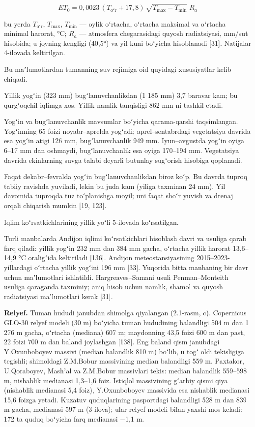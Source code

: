 \begin{equation}\tag{2.1}
ET_0 = 0{,}0023 \, (T_{\mathrm{oʻr}} + 17{,}8) \, \sqrt{T_{\mathrm{max}} - T_{\mathrm{min}}} \; R_a
\end{equation}

bu yerda \(T_{\mathrm{oʻr}}\), \(T_{\mathrm{max}}\),
\(T_{\mathrm{min}}\) --- oylik oʻrtacha, oʻrtacha maksimal va oʻrtacha
minimal harorat, °C; \(R_{a}\) --- atmosfera chegarasidagi quyosh
radiatsiyasi, mm/sut hisobida; u joyning kengligi (40,5°) va yil kuni
boʻyicha hisoblanadi {[}31{]}. Natijalar 4-ilovada keltirilgan.

Bu maʼlumotlardan tumanning suv rejimiga oid quyidagi xususiyatlar kelib
chiqadi.

Yillik yogʻin (323 mm) bugʻlanuvchanlikdan (1 185 mm) 3,7 baravar kam;
bu qurgʻoqchil iqlimga xos. Yillik namlik tanqisligi 862 mm ni tashkil
etadi.

Yogʻin va bugʻlanuvchanlik mavsumlar boʻyicha qarama-qarshi
taqsimlangan. Yogʻinning 65 foizi noyabr--aprelda yogʻadi;
aprel--sentabrdagi vegetatsiya davrida esa yogʻin atigi 126 mm,
bugʻlanuvchanlik 949 mm. Iyun--avgustda yogʻin oyiga 6--17 mm dan
oshmaydi, bugʻlanuvchanlik esa oyiga 170--194 mm. Vegetatsiya davrida
ekinlarning suvga talabi deyarli butunlay sugʻorish hisobiga qoplanadi.

Faqat dekabr--fevralda yogʻin bugʻlanuvchanlikdan biroz koʻp. Bu davrda
tuproq tabiiy ravishda yuviladi, lekin bu juda kam (yiliga taxminan 24
mm). Yil davomida tuproqda tuz toʻplanishga moyil; uni faqat shoʻr
yuvish va drenaj orqali chiqarish mumkin {[}19, 123{]}.

Iqlim koʻrsatkichlarining yillik yoʻli 5-ilovada koʻrsatilgan.

Turli manbalarda Andijon iqlimi koʻrsatkichlari hisoblash davri va
usuliga qarab farq qiladi: yillik yogʻin 232 mm dan 384 mm gacha,
oʻrtacha yillik harorat 13,6--14,9 °C oraligʻida keltiriladi {[}136{]}.
Andijon meteostansiyasining 2015--2023-yillardagi oʻrtacha yillik
yogʻini 196 mm {[}33{]}. Yuqorida bitta manbaning bir davr uchun
maʼlumotlari ishlatildi. Hargreaves--Samani usuli Penman--Monteith
usuliga qaraganda taxminiy; aniq hisob uchun namlik, shamol va quyosh
radiatsiyasi maʼlumotlari kerak {[}31{]}.

\textbf{Relyef.} Tuman hududi janubdan shimolga qiyalangan (2.1-rasm,
c). Copernicus GLO-30 relyef modeli (30 m) boʻyicha tuman hududining
balandligi 504 m dan 1 276 m gacha, oʻrtacha (mediana) 607 m; maydonning
43,5 foizi 600 m dan past, 22 foizi 700 m dan baland joylashgan
{[}138{]}. Eng baland qism janubdagi Y.Oxunboboyev massivi (median
balandlik 810 m) boʻlib, u togʻ oldi tekisligiga tegishli; shimoldagi
Z.M.Bobur massivining median balandligi 559 m. Paxtakor, U.Qoraboyev,
Mashʼal va Z.M.Bobur massivlari tekis: median balandlik 559--598 m,
nishablik medianasi 1,3--1,6 foiz. Istiqlol massivining gʻarbiy qismi
qiya (nishablik medianasi 5,4 foiz), Y.Oxunboboyev massivida esa
nishablik medianasi 15,6 foizga yetadi. Kuzatuv quduqlarining
pasportdagi balandligi 528 m dan 839 m gacha, medianasi 597 m (3-ilova);
ular relyef modeli bilan yaxshi mos keladi: 172 ta quduq boʻyicha farq
medianasi −1,1 m.

